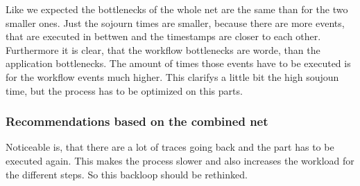 Like we expected the bottlenecks of the whole net are the same than for the two smaller ones. Just the sojourn times are smaller, because there are more events, that are executed in bettwen and the timestamps are closer to each other. Furthermore it is clear, that the workflow bottlenecks are worde, than the application bottlenecks. The amount of times those events have to be executed is for the workflow events much higher. This clarifys a little bit the high soujoun time, but the process has to be optimized on this parts.

\subsubsection{Recommendations based on the combined net}

Noticeable is, that there are a lot of traces going back and the part has to be executed again. This makes the process slower and also increases the workload for the different steps. So this backloop should be rethinked. 
